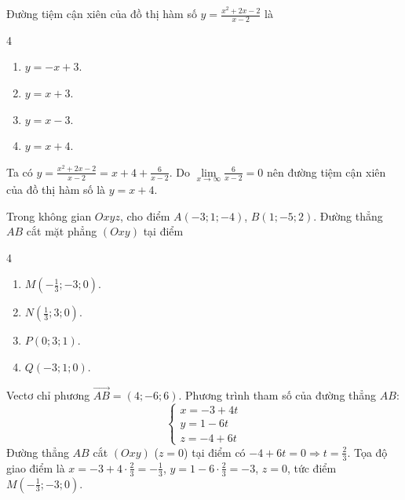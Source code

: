 \begin{baitap}
	Đường tiệm cận xiên của đồ thị hàm số $y = \frac{x^2 + 2x - 2}{x - 2}$ là
	\begin{multicols}{4}
		\begin{enumerate}
			\item $y = -x + 3$.
			\item $y = x + 3$.
			\item $y = x - 3$.
			\item $y = x + 4$.
		\end{enumerate}
	\end{multicols}
	\begin{traloi}
		Ta có $y = \frac{x^2 + 2x - 2}{x - 2} = x + 4 + \frac{6}{x - 2}$.
		Do $\lim\limits_{x \to \infty} \frac{6}{x - 2} = 0$ nên đường tiệm cận xiên của đồ thị hàm số là $y = x + 4$.
	\end{traloi}
\end{baitap}

\begin{baitap}
	Trong không gian $Oxyz$, cho điểm $A(-3; 1; -4)$, $B(1; -5; 2)$. Đường thẳng $AB$ cắt mặt phẳng $(Oxy)$ tại điểm
	\begin{multicols}{4}
		\begin{enumerate}
			\item $M\left(-\frac{1}{3}; -3; 0\right)$.
			\item $N\left(\frac{1}{3}; 3; 0\right)$.
			\item $P(0; 3; 1)$.
			\item $Q(-3; 1; 0)$.
		\end{enumerate}
	\end{multicols}
	\begin{traloi}
		\dapan{A}
		Vectơ chỉ phương $\overrightarrow{AB} = (4; -6; 6)$.
		Phương trình tham số của đường thẳng $AB$:
		\[
		\begin{cases}
			x = -3 + 4t \\
			y = 1 - 6t \\
			z = -4 + 6t
		\end{cases}
		\]
		Đường thẳng $AB$ cắt $(Oxy)$ ($z = 0$) tại điểm có $-4 + 6t = 0 \Rightarrow t = \frac{2}{3}$.
		Tọa độ giao điểm là $x = -3 + 4\cdot\frac{2}{3} = -\frac{1}{3}$, $y = 1 - 6\cdot\frac{2}{3} = -3$, $z = 0$, tức điểm $M\left(-\frac{1}{3}; -3; 0\right)$.
	\end{traloi}
\end{baitap}
